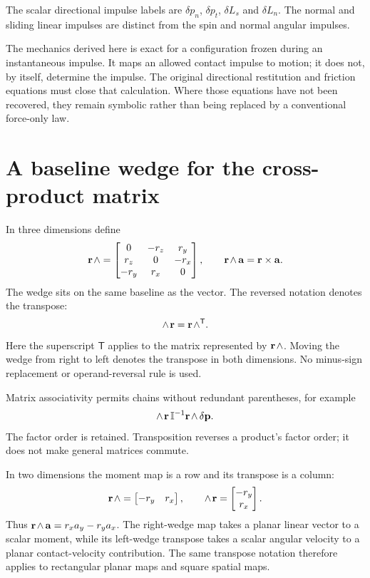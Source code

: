 \documentclass[11pt,a4paper]{article}
\newcommand{\rw}[1]{\mathord{#1\mkern2mu\wedge}}
\newcommand{\lwedge}[1]{\mathord{\wedge\mkern2mu#1}}
\newcommand{\inertia}{\mathbb I}
\begin{document}
The scalar directional impulse labels are $\delta p_n$, $\delta p_t$, $\delta L_s$ and $\delta L_n$. The normal and sliding linear impulses are distinct from the spin and normal angular impulses.

The mechanics derived here is exact for a configuration frozen during an instantaneous impulse. It maps an allowed contact impulse to motion; it does not, by itself, determine the impulse. The original directional restitution and friction equations must close that calculation. Where those equations have not been recovered, they remain symbolic rather than being replaced by a conventional force-only law.

\section{A baseline wedge for the cross-product matrix}
In three dimensions define
\begin{equation}
\rw{\mathbf{r}}=
\begin{bmatrix}
0&-r_z&r_y\\r_z&0&-r_x\\-r_y&r_x&0
\end{bmatrix},\qquad
\rw{\mathbf{r}}\,\mathbf{a}=\mathbf{r}\times \mathbf{a}.
\end{equation}
The wedge sits on the same baseline as the vector. The reversed notation denotes the transpose:
\begin{equation}
\lwedge{\mathbf{r}}=\rw{\mathbf{r}}^{\mathsf T}.
\end{equation}
Here the superscript $\mathsf T$ applies to the matrix represented by $\rw{\mathbf{r}}$. Moving the wedge from right to left denotes the transpose in both dimensions. No minus-sign replacement or operand-reversal rule is used.

Matrix associativity permits chains without redundant parentheses, for example
\begin{equation}
\lwedge{\mathbf{r}}\,\inertia^{-1}\rw{\mathbf{r}}\,\delta \mathbf{p}.
\end{equation}
The factor order is retained. Transposition reverses a product's factor order; it does not make general matrices commute.

In two dimensions the moment map is a row and its transpose is a column:
\begin{equation}
\rw{\mathbf{r}}=\begin{bmatrix}-r_y&r_x\end{bmatrix},\qquad
\lwedge{\mathbf{r}}=\begin{bmatrix}-r_y\\r_x\end{bmatrix}.
\end{equation}
Thus $\rw{\mathbf{r}}\,\mathbf{a}=r_xa_y-r_ya_x$. The right-wedge map takes a planar linear vector to a scalar moment, while its left-wedge transpose takes a scalar angular velocity to a planar contact-velocity contribution. The same transpose notation therefore applies to rectangular planar maps and square spatial maps.
\end{document}
